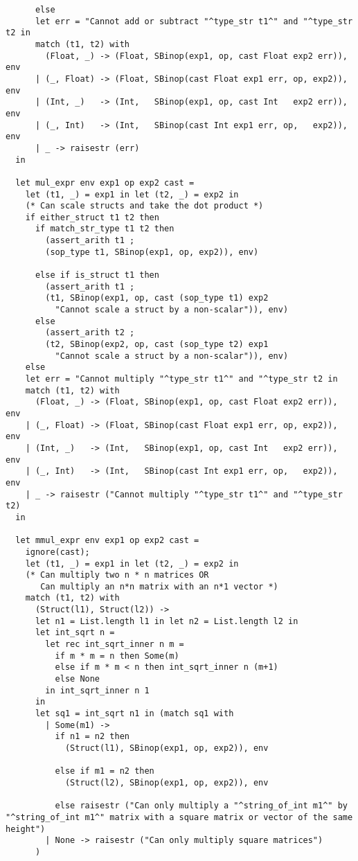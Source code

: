 \documentclass[main.tex]{subfiles}
\begin{document}
\begin{lstlisting}
      else
      let err = "Cannot add or subtract "^type_str t1^" and "^type_str t2 in
      match (t1, t2) with
        (Float, _) -> (Float, SBinop(exp1, op, cast Float exp2 err)), env
      | (_, Float) -> (Float, SBinop(cast Float exp1 err, op, exp2)), env
      | (Int, _)   -> (Int,   SBinop(exp1, op, cast Int   exp2 err)), env
      | (_, Int)   -> (Int,   SBinop(cast Int exp1 err, op,   exp2)), env
      | _ -> raisestr (err)
  in

  let mul_expr env exp1 op exp2 cast = 
    let (t1, _) = exp1 in let (t2, _) = exp2 in
    (* Can scale structs and take the dot product *)
    if either_struct t1 t2 then
      if match_str_type t1 t2 then
        (assert_arith t1 ;
        (sop_type t1, SBinop(exp1, op, exp2)), env)

      else if is_struct t1 then
        (assert_arith t1 ;
        (t1, SBinop(exp1, op, cast (sop_type t1) exp2
          "Cannot scale a struct by a non-scalar")), env)
      else
        (assert_arith t2 ;
        (t2, SBinop(exp2, op, cast (sop_type t2) exp1
          "Cannot scale a struct by a non-scalar")), env)
    else
    let err = "Cannot multiply "^type_str t1^" and "^type_str t2 in
    match (t1, t2) with
      (Float, _) -> (Float, SBinop(exp1, op, cast Float exp2 err)), env
    | (_, Float) -> (Float, SBinop(cast Float exp1 err, op, exp2)), env
    | (Int, _)   -> (Int,   SBinop(exp1, op, cast Int   exp2 err)), env
    | (_, Int)   -> (Int,   SBinop(cast Int exp1 err, op,   exp2)), env
    | _ -> raisestr ("Cannot multiply "^type_str t1^" and "^type_str t2)
  in

  let mmul_expr env exp1 op exp2 cast =
    ignore(cast); 
    let (t1, _) = exp1 in let (t2, _) = exp2 in
    (* Can multiply two n * n matrices OR
       Can multiply an n*n matrix with an n*1 vector *)
    match (t1, t2) with
      (Struct(l1), Struct(l2)) ->
      let n1 = List.length l1 in let n2 = List.length l2 in
      let int_sqrt n =
        let rec int_sqrt_inner n m = 
          if m * m = n then Some(m)
          else if m * m < n then int_sqrt_inner n (m+1)
          else None
        in int_sqrt_inner n 1
      in
      let sq1 = int_sqrt n1 in (match sq1 with
        | Some(m1) -> 
          if n1 = n2 then
            (Struct(l1), SBinop(exp1, op, exp2)), env

          else if m1 = n2 then
            (Struct(l2), SBinop(exp1, op, exp2)), env

          else raisestr ("Can only multiply a "^string_of_int m1^" by "^string_of_int m1^" matrix with a square matrix or vector of the same height")
        | None -> raisestr ("Can only multiply square matrices")
      )


\end{lstlisting}
\end{document}

